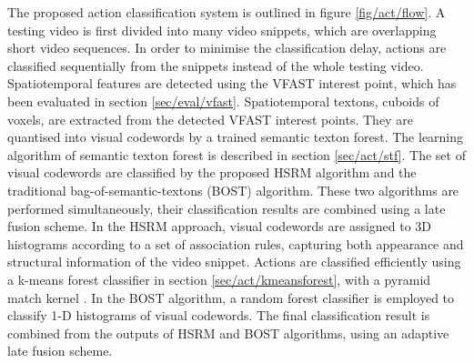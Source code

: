 The proposed action classification system is outlined in figure \ref{fig/act/flow}. A testing video is first divided into many video snippets, which are overlapping short video sequences. In order to minimise the classification delay, actions are classified sequentially from the snippets instead of the whole testing video. 
Spatiotemporal features are detected using the VFAST interest point, which has been evaluated in section \ref{sec/eval/vfast}.
Spatiotemporal textons, \ie cuboids of voxels, are extracted from the detected VFAST interest points. They are quantised into visual codewords by a trained semantic texton forest. The learning algorithm of semantic texton forest is described in section \ref{sec/act/stf}. 
The set of visual codewords are classified by the proposed HSRM algorithm and the traditional bag-of-semantic-textons (BOST) algorithm. These two algorithms are performed simultaneously, their classification results are combined using a late fusion scheme. In the HSRM approach, visual codewords are assigned to 3D histograms according to a set of association rules, capturing both appearance and structural information of the video snippet. Actions are classified efficiently using a k-means forest classifier in section \ref{sec/act/kmeansforest}, with a pyramid match kernel \cite{Grauman2005}. 
In the BOST algorithm, a random forest classifier is employed to classify 1-D histograms of visual codewords. 
The final classification result is combined from the outputs of HSRM and BOST algorithms, using an adaptive late fusion scheme. 



